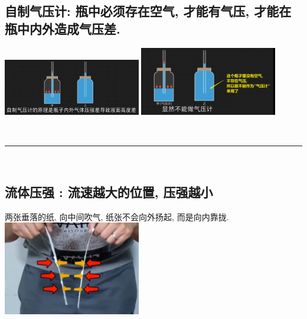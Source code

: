\documentclass[UTF8]{ctexart}
\begin{document}
	\subsection{自制气压计: 瓶中必须存在空气, 才能有气压, 才能在瓶中内外造成气压差.}
	
	\includegraphics[width=0.45\textwidth]{img/0034.png} 
	\includegraphics[width=0.45\textwidth]{img/0035.png} 
		
	
	~\\
	\hrule
	~\\
	
	
	\subsection{流体压强 : 流速越大的位置, 压强越小}
	
	\begin{tcolorbox}[title = {例},boxrule={0.1em},colframe={black!10}, colback={black!3},colbacktitle={black!10},coltitle={black}]
	两张垂落的纸, 向中间吹气, 纸张不会向外扬起, 而是向内靠拢. \\

\includegraphics[width=0.45\textwidth]{img/0037.png}
	\end{tcolorbox}
\end{document}
